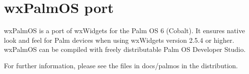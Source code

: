 \section{wxPalmOS port}\label{wxpalmosport}

wxPalmOS is a port of wxWidgets for the Palm OS 6 (Cobalt).
It ensures native look and feel for Palm devices when using
wxWidgets version 2.5.4 or higher. wxPalmOS can be compiled
with freely distributable Palm OS Developer Studio.

For further information, please see the files in docs/palmos
in the distribution.

